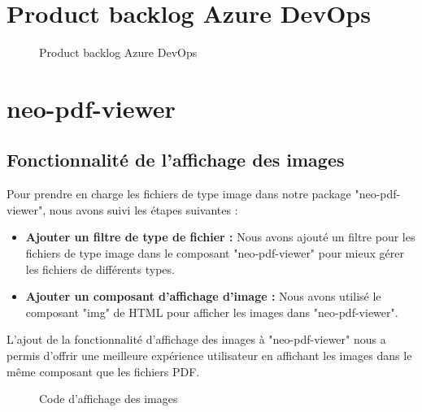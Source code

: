 \setcounter{part}{0}
\setcounter{chapter}{0}
\setcounter{section}{0}
\renewcommand{\thechapter}{\arabic{chapter}}
\renewcommand{\thepart}{\arabic{part}}
\renewcommand{\thesection}{\arabic{section}}


\section{Product backlog Azure DevOps}

\begin{figure}[H]
    \centering
    \caption{Product backlog Azure DevOps}
    \label{fig:product_backlog_azure_devops}
\end{figure}

\label{appendix:product_backlog_azure_devops}



\section{neo-pdf-viewer}

\subsection{Fonctionnalité de l'affichage des images}

Pour prendre en charge les fichiers de type image dans notre package "neo-pdf-viewer", nous avons suivi les étapes suivantes :
\begin{itemize}
    \item \textbf{Ajouter un filtre de type de fichier :} Nous avons ajouté un filtre pour les fichiers de type image dans le composant "neo-pdf-viewer" pour mieux gérer les fichiers de différents types.
    \item \textbf{Ajouter un composant d'affichage d'image :} Nous avons utilisé le composant "img" de HTML pour afficher les images dans "neo-pdf-viewer".
\end{itemize}

L'ajout de la fonctionnalité d'affichage des images à "neo-pdf-viewer" nous a permis d'offrir une meilleure expérience utilisateur en affichant les images dans le même composant que les fichiers PDF.

\begin{figure}[H]
    \centering
    \caption{Code d'affichage des images}
    \label{fig:codedisplayimage}
\end{figure}

